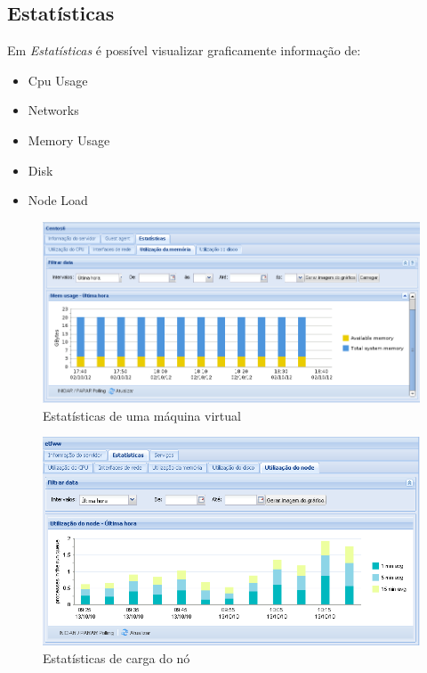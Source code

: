 \subsection{Estatísticas}
Em \emph{Estatísticas} é possível visualizar graficamente informação de:
\begin{itemize}
	\item Cpu Usage
	\item Networks
	\item Memory Usage
	\item Disk
	\item Node Load
\end{itemize}

\begin{figure}[H]
	\begin{center}
	\includegraphics[scale=0.45]{screenshots/server_stats_memUsage.png}
	\caption{Estatísticas de uma máquina virtual}
	\label{fig:server_stats_memUsage}
	\end{center}
\end{figure}

\begin{figure}[H]
	\begin{center}
	\includegraphics[scale=0.45]{screenshots/server_stats_nodeLoad.png}
	\caption{Estatísticas de carga do nó}
	\label{fig:server_stats_nodeLoad}
	\end{center}
\end{figure}

